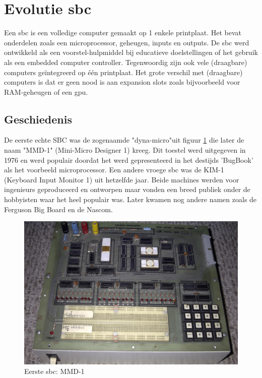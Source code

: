 \newpage		
\section{Evolutie \gls{sbc}}
Een \gls{sbc} is een volledige computer gemaakt op 1 enkele printplaat. Het bevat onderdelen zoals een microprocessor, geheugen, inputs en outputs. De \gls{sbc} werd ontwikkeld als een voorstel-hulpmiddel bij educatieve doelstellingen of het gebruik als een embedded computer controller. Tegenwoordig zijn ook vele (draagbare) computers ge\"integreerd op \'e\'en printplaat. Het grote verschil met (draagbare) computers is dat er geen nood is aan expansion slots zoals bijvoorbeeld voor RAM-geheugen of een \gls{gpu}.
	\subsection{Geschiedenis}
	De eerste echte SBC was de zogenaamde "dyna-micro"\space uit figuur \ref{fig:eersteSBC} die later de naam "MMD-1" (Mini-Micro Designer 1) kreeg. Dit toestel werd uitgegeven in 1976 en werd populair doordat het werd gepresenteerd in het destijds 'BugBook' als het voorbeeld microprocessor. Een andere vroege \gls{sbc} was de KIM-1 (Keyboard Input Monitor 1) uit hetzelfde jaar. Beide machines werden voor ingenieurs geproduceerd en ontworpen maar vonden een breed publiek onder de hobbyisten waar het heel populair was. Later kwamen nog andere namen zoals de Ferguson Big Board en de Nascom.

	\begin{figure}
		\centering
		\includegraphics[width=120mm]{afbeeldingen/Early_1976_MMD1_Prototype_most_chips_removed.PNG}
		\caption{Eerste \gls{sbc}: MMD-1}
		\label{fig:eersteSBC}
	\end{figure}
	
